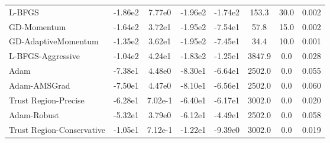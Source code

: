 \documentclass{article}
\begin{document}
\begin{table}[htbp]
{\begin{tabular}{p{2.5cm}*{7}{c}}
L-BFGS & -1.86e2 & 7.77e0 & -1.96e2 & -1.74e2 & 153.3 & 30.0 & 0.002 \\
GD-Momentum & -1.64e2 & 3.72e1 & -1.95e2 & -7.54e1 & 57.8 & 15.0 & 0.002 \\
GD-AdaptiveMomentum & -1.35e2 & 3.62e1 & -1.95e2 & -7.45e1 & 34.4 & 10.0 & 0.001 \\
L-BFGS-Aggressive & -1.04e2 & 4.24e1 & -1.83e2 & -1.25e1 & 3847.9 & 0.0 & 0.028 \\
Adam & -7.38e1 & 4.48e0 & -8.30e1 & -6.64e1 & 2502.0 & 0.0 & 0.055 \\
Adam-AMSGrad & -7.50e1 & 4.47e0 & -8.10e1 & -6.56e1 & 2502.0 & 0.0 & 0.060 \\
Trust Region-Precise & -6.28e1 & 7.02e-1 & -6.40e1 & -6.17e1 & 3002.0 & 0.0 & 0.020 \\
Adam-Robust & -5.32e1 & 3.79e0 & -6.12e1 & -4.49e1 & 2502.0 & 0.0 & 0.058 \\
Trust Region-Conservative & -1.05e1 & 7.12e-1 & -1.22e1 & -9.39e0 & 3002.0 & 0.0 & 0.019 \\
\bottomrule
\end{tabular}
}
\end{table}
\end{document}
